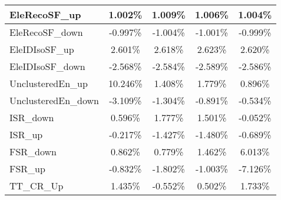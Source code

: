 \begin{table}[]
{\begin{tabular}{|l|c|c|c|c|}
EleRecoSF\_up                            & 1.002\%                             & 1.009\%                             & 1.006\%                            & 1.004\%                             \\ \hline
EleRecoSF\_down                          & -0.997\%                           & -1.004\%                           & -1.001\%                          & -0.999\%                           \\ \hline
EleIDIsoSF\_up                              & 2.601\%                               & 2.618\%                               & 2.623\%                              & 2.620\%                               \\ \hline
EleIDIsoSF\_down                            & -2.568\%                             & -2.584\%                             & -2.589\%                            & -2.586\%                             \\ \hline
UnclusteredEn\_up                         & 10.246\%                          & 1.408\%                          & 1.779\%                         & 0.896\%                          \\ \hline
UnclusteredEn\_down                      & -3.109\%                         & -1.304\%                        & -0.891\%                       & -0.534\%                        \\ \hline   \hline
ISR\_down                                & 0.596\%                                   & 1.777\%                                  & 1.501\%                                 & -0.052\%                                  \\ \hline
ISR\_up                                  & -0.217\%                                     & -1.427\%                                    & -1.480\%                                   & -0.689\%                                    \\ \hline
FSR\_down                                & 0.862\%                                   & 0.779\%                                  & 1.462\%                                 & 6.013\%                                  \\ \hline
FSR\_up                                  & -0.832\%                                     & -1.802\%                                    & -1.003\%                                   & -7.126\%                                    \\ \hline
TT\_CR\_Up                        & 1.435\%                           & -0.552\%                          & 0.502\%                         & 1.733\%                          \\ \hline

\end{tabular}}
\end{table}
